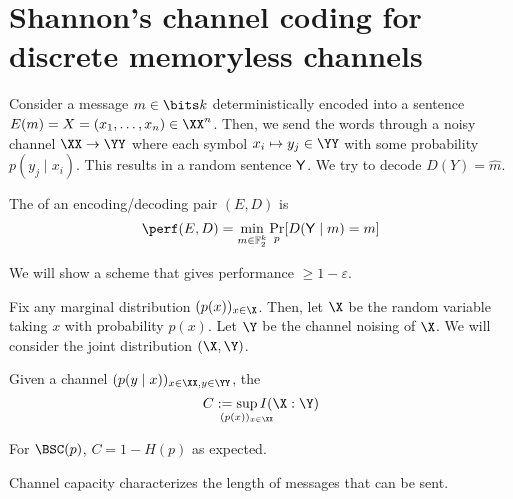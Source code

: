 \documentclass[class=co432,notes,tikz]{agony}
\begin{document}
\section{Shannon's channel coding for discrete memoryless channels}

Consider a message $m \in \bits k$ deterministically encoded into a sentence
$E(m) = X = (x_1,\dotsc,x_n) \in \XX^n$.
Then, we send the words through a noisy channel $\XX \to \YY$
where each symbol $x_i \mapsto y_j \in \YY$ with some probability $p(y_j \mid x_i)$.
This results in a random sentence $\mathsf Y$.
We try to decode $D(Y) = \hat m$.

\begin{defn}
  The  of an encoding/decoding pair $(E,D)$ is
  \[ \perf(E,D) = \min_{m\in\F_2^k} \Pr_{p}[D(\rv Y \mid m) = m] \]
\end{defn}

We will show a scheme that gives performance $\geq 1-\varepsilon$.

Fix any marginal distribution $(p(x))_{x\in\X}$.
Then, let $\X$ be the random variable taking $x$ with probability $p(x)$.
Let $\Y$ be the channel noising of $\X$.
We will consider the joint distribution $(\X,\Y)$.

\begin{defn}
  Given a channel $(p(y \mid x))_{x\in\XX,y\in\YY}$, the 
  \[ C := \sup_{\mathclap{(p(x))_{x\in\XX}}} I(\X : \Y) \]
\end{defn}

For $\BSC(p)$, $C = 1-H(p)$ as expected.

Channel capacity characterizes the length of messages that can be sent.
\end{document}
